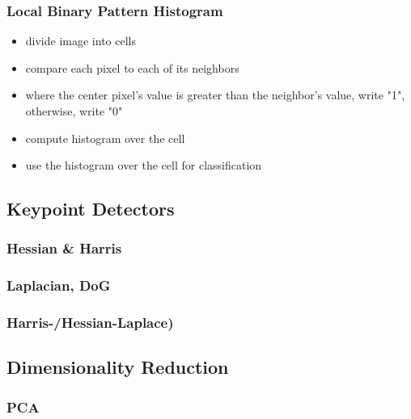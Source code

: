 \documentclass[paper=a4, fontsize=11pt]{scrartcl} %
\numberwithin{equation}{section} %
\numberwithin{figure}{section} %
\numberwithin{table}{section} %
\begin{document}
\subsubsection{Local Binary Pattern Histogram}

\begin{itemize}
\item divide image into cells
\item compare each pixel to each of its neighbors
\item where the center pixel's value is greater than the neighbor's value, write "1", otherwise, write "0"
\item compute histogram over the cell
\item use the histogram over the cell for classification
\end{itemize}

\subsection{Keypoint Detectors}

\subsubsection{Hessian \& Harris}

\subsubsection{Laplacian, DoG}

\subsubsection{Harris-/Hessian-Laplace)}

\subsection{Dimensionality Reduction}

\subsubsection{PCA}
\end{document}
